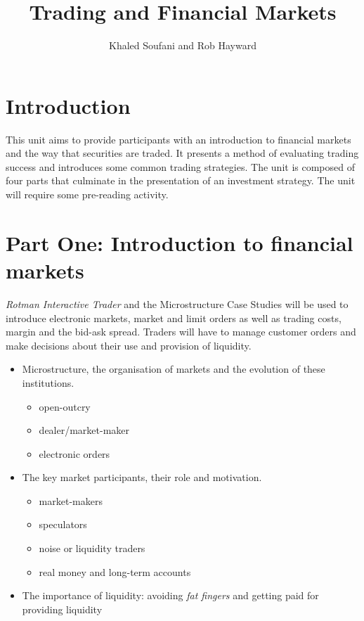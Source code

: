 \documentclass[12pt, a4paper, oneside]{hitec}\usepackage[]{graphicx}\usepackage[]{color}
\begin{document}
\title{Trading and Financial Markets}
\author{Khaled Soufani and Rob Hayward}
\maketitle
\section*{Introduction}
This unit aims to provide participants with an introduction to financial markets and the way that securities are traded.  It presents a method of evaluating trading success and introduces some common trading strategies.  The unit is composed of four parts that culminate in the presentation of an investment strategy.  The unit will require some pre-reading activity.

\section*{Part One: Introduction to financial markets}
\emph{Rotman Interactive Trader} and the Microstructure Case Studies will be used to introduce electronic markets, market and limit orders as well as trading costs, margin and the bid-ask spread. Traders will have to manage customer orders and make decisions about their use and provision of liquidity.  
\begin{itemize}
\item Microstructure, the organisation of markets and the evolution of these institutions. 
\begin{itemize}
\item open-outcry
\item dealer/market-maker
\item electronic orders
\end{itemize}
\item The key market participants, their role and motivation. 
\begin{itemize}
\item market-makers
\item speculators
\item noise or liquidity traders
\item real money and long-term accounts
\end{itemize}
\item The importance of liquidity: avoiding \emph{fat fingers} and getting paid for providing liquidity
\end{itemize}
\end{document}
